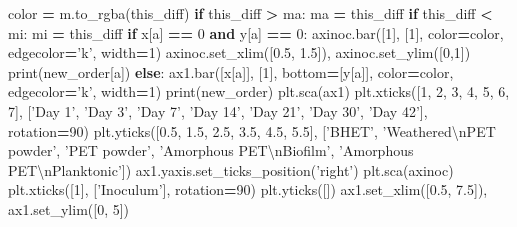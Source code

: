 \documentclass[
]{article}
\newenvironment{Shaded}{\begin{snugshade}}{\end{snugshade}}
\newcommand{\BuiltInTok}[1]{#1}
\newcommand{\CharTok}[1]{\textcolor[rgb]{0.31,0.60,0.02}{#1}}
\newcommand{\ControlFlowTok}[1]{\textcolor[rgb]{0.13,0.29,0.53}{\textbf{#1}}}
\newcommand{\DecValTok}[1]{\textcolor[rgb]{0.00,0.00,0.81}{#1}}
\newcommand{\FloatTok}[1]{\textcolor[rgb]{0.00,0.00,0.81}{#1}}
\newcommand{\KeywordTok}[1]{\textcolor[rgb]{0.13,0.29,0.53}{\textbf{#1}}}
\newcommand{\NormalTok}[1]{#1}
\newcommand{\OperatorTok}[1]{\textcolor[rgb]{0.81,0.36,0.00}{\textbf{#1}}}
\newcommand{\StringTok}[1]{\textcolor[rgb]{0.31,0.60,0.02}{#1}}
\begin{document}
\begin{Shaded}
\begin{Highlighting}[]
\NormalTok{    color }\OperatorTok{=}\NormalTok{ m.to_rgba(this_diff)}
    \ControlFlowTok{if}\NormalTok{ this_diff }\OperatorTok{>}\NormalTok{ ma: ma }\OperatorTok{=}\NormalTok{ this_diff}
    \ControlFlowTok{if}\NormalTok{ this_diff }\OperatorTok{<}\NormalTok{ mi: mi }\OperatorTok{=}\NormalTok{ this_diff}
    \ControlFlowTok{if}\NormalTok{ x[a] }\OperatorTok{==} \DecValTok{0} \KeywordTok{and}\NormalTok{ y[a] }\OperatorTok{==} \DecValTok{0}\NormalTok{:}
\NormalTok{      axinoc.bar([}\DecValTok{1}\NormalTok{], [}\DecValTok{1}\NormalTok{], color}\OperatorTok{=}\NormalTok{color, edgecolor}\OperatorTok{=}\StringTok{'k'}\NormalTok{, width}\OperatorTok{=}\DecValTok{1}\NormalTok{)}
\NormalTok{      axinoc.set_xlim([}\FloatTok{0.5}\NormalTok{, }\FloatTok{1.5}\NormalTok{]), axinoc.set_ylim([}\DecValTok{0}\NormalTok{,}\DecValTok{1}\NormalTok{])}
      \BuiltInTok{print}\NormalTok{(new_order[a])}
    \ControlFlowTok{else}\NormalTok{:}
\NormalTok{      ax1.bar([x[a]], [}\DecValTok{1}\NormalTok{], bottom}\OperatorTok{=}\NormalTok{[y[a]], color}\OperatorTok{=}\NormalTok{color, edgecolor}\OperatorTok{=}\StringTok{'k'}\NormalTok{, width}\OperatorTok{=}\DecValTok{1}\NormalTok{)}
  \BuiltInTok{print}\NormalTok{(new_order)}
\NormalTok{  plt.sca(ax1)}
\NormalTok{  plt.xticks([}\DecValTok{1}\NormalTok{, }\DecValTok{2}\NormalTok{, }\DecValTok{3}\NormalTok{, }\DecValTok{4}\NormalTok{, }\DecValTok{5}\NormalTok{, }\DecValTok{6}\NormalTok{, }\DecValTok{7}\NormalTok{], [}\StringTok{'Day 1'}\NormalTok{, }\StringTok{'Day 3'}\NormalTok{, }\StringTok{'Day 7'}\NormalTok{, }\StringTok{'Day 14'}\NormalTok{, }\StringTok{'Day 21'}\NormalTok{, }\StringTok{'Day 30'}\NormalTok{, }\StringTok{'Day 42'}\NormalTok{], rotation}\OperatorTok{=}\DecValTok{90}\NormalTok{)}
\NormalTok{  plt.yticks([}\FloatTok{0.5}\NormalTok{, }\FloatTok{1.5}\NormalTok{, }\FloatTok{2.5}\NormalTok{, }\FloatTok{3.5}\NormalTok{, }\FloatTok{4.5}\NormalTok{, }\FloatTok{5.5}\NormalTok{], [}\StringTok{'BHET'}\NormalTok{, }\StringTok{'Weathered}\CharTok{\textbackslash{}n}\StringTok{PET powder'}\NormalTok{, }\StringTok{'PET powder'}\NormalTok{, }\StringTok{'Amorphous PET}\CharTok{\textbackslash{}n}\StringTok{Biofilm'}\NormalTok{, }\StringTok{'Amorphous PET}\CharTok{\textbackslash{}n}\StringTok{Planktonic'}\NormalTok{])}
\NormalTok{  ax1.yaxis.set_ticks_position(}\StringTok{'right'}\NormalTok{)}
\NormalTok{  plt.sca(axinoc)}
\NormalTok{  plt.xticks([}\DecValTok{1}\NormalTok{], [}\StringTok{'Inoculum'}\NormalTok{], rotation}\OperatorTok{=}\DecValTok{90}\NormalTok{)}
\NormalTok{  plt.yticks([])}
\NormalTok{  ax1.set_xlim([}\FloatTok{0.5}\NormalTok{, }\FloatTok{7.5}\NormalTok{]), ax1.set_ylim([}\DecValTok{0}\NormalTok{, }\DecValTok{5}\NormalTok{])}

\end{Highlighting}
\end{Shaded}
\end{document}
